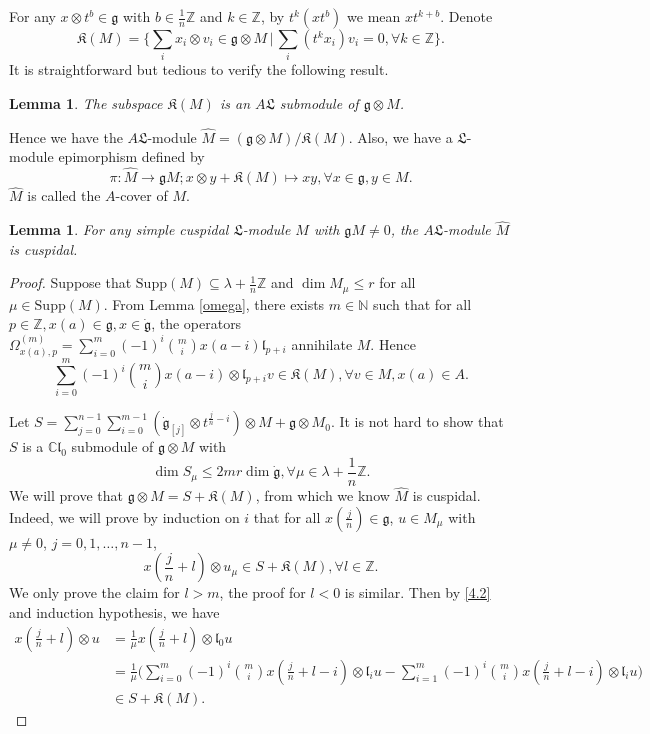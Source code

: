 \documentclass[1p]{elsarticle}
\numberwithin{equation}{section}
\def\dg{\dot{\mathfrak{g}}}
\def\fg{\mathfrak{g}}
\def\fL{\mathfrak{L}}
\def\fK{\mathfrak{K}}
\def\Supp{\mathrm{Supp}}
\def\bC{\mathbb{C}}
\def\bN{\mathbb{N}}
\def\bZ{\mathbb{Z}}
\def\fl{\mathfrak{l}}
\newtheorem{lemm}[theo]{Lemma}
\begin{document}
For any $x\otimes t^b\in \fg$ with $b\in \frac 1n \bZ$ and $k\in\bZ$, by
$t^k(xt^b)$
 we mean $xt^{k+b}$.
Denote $$\fK(M)=\{\sum\limits_{i}x_i\otimes v_i\in \fg\otimes M\,|\,\sum\limits_{i}(t^kx_i)v_i=0, \forall k\in \bZ\}.$$ It is straightforward but tedious to verify the following result.

\begin{lemm}\label{submod} The subspace $\fK(M)$ is an $A\fL$ submodule of $\fg\otimes M$. 
\end{lemm}


 Hence we have the $A\fL$-module $\widehat{M}=(\fg\otimes M)/\fK(M)$. Also, we have a $\fL$-module epimorphism defined by
\[\pi: \widehat{M}\to \fg M; x\otimes y+\fK(M)\mapsto xy, \forall x\in \fg, y\in M.\]
$\widehat{M}$ is called the $A$-cover of $M$.


\begin{lemm}\label{covercuspidal}
For any  simple cuspidal $\fL$-module $M$ with $\fg M\ne 0$, the $A\fL$-module $\widehat{M}$ is cuspidal.
\end{lemm}
\begin{proof} Suppose that $\Supp(M)\subseteq \lambda+\frac{1}{n}\bZ$ and $\dim M_\mu\leq r$ for all $\mu\in\Supp(M)$. From Lemma \ref{omega}, there exists $m\in\bN$ such that for all $p\in\bZ, x(a)\in \fg, x\in  \dg$, the operators
$\Omega_{x(a),p}^{(m)}=\sum\limits_{i=0}^m(-1)^i\binom{m}{i}x(a-i)\fl_{p+i}$ annihilate $M$. Hence
\begin{equation}\label{4.2}\sum\limits_{i=0}^m(-1)^i\binom{m}{i}x(a-i)\otimes \fl_{p+i}v\in \fK(M),\forall v\in M,x(a)\in A.\end{equation}


Let $S=\sum_{j=0}^{n-1}\sum_{i=0}^{m-1} (\dg_{[j]}\otimes t^{\frac jn -i})\otimes M+\fg\otimes M_0$. It is not hard to show that $S$ is a $\bC \fl_0$ submodule of $\fg\otimes M$ with \[\dim S_\mu\leq 2mr\dim \dg , \forall \mu\in\lambda+\frac{1}{n}\bZ.\]
We will prove that $\fg\otimes M=S+\fK(M)$, from which we know $\widehat{M}$ is cuspidal. Indeed, we will prove by induction on $i$ that for all $x(\frac jn)\in \fg$, $u\in M_\mu$ with $\mu \ne 0$, $j=0,1,\ldots,n-1$,
\[
x(\frac jn+l)\otimes u_{\mu}\in S+\fK(M),\forall l\in \bZ.
\]
We only prove the claim for $l>m$, the proof for $l<0$ is similar. Then by \eqref{4.2} and induction hypothesis, we have
\begin{align*}x(\frac jn+l)\otimes u &=\frac 1\mu x(\frac jn+l)\otimes \fl_0u\\ &=\frac 1\mu \Big(\sum\limits_{i=0}^m(-1)^i\binom{m}{i}x(\frac jn+l-i)\otimes \fl_i u-\sum\limits_{i=1}^{m}(-1)^i\binom{m}{i}x(\frac jn+l-i)\otimes \fl_i u\Big)\\ &\in S+\fK(M).\end{align*}
\end{proof}
\end{document}
